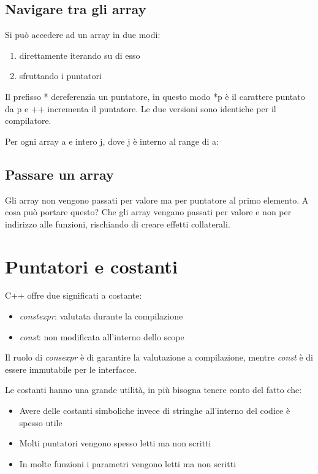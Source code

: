 \documentclass[11pt,a4paper]{book}
\begin{document}
\subsection{Navigare tra gli array}
Si può accedere ad un array in due modi:
\begin{enumerate}
	\item direttamente iterando su di esso
	\item sfruttando i puntatori
\end{enumerate}
\label{code: 090}
Il prefisso * dereferenzia un puntatore, in questo modo *p è il carattere puntato da p e ++ incrementa il puntatore. Le due versioni sono identiche per il compilatore.

Per ogni array a e intero j, dove j è interno al range di a:
\label{code: 091}

\subsection{Passare un array}
Gli array non vengono passati per valore ma per puntatore al primo elemento.
\label{code: 092}
A cosa può portare questo? Che gli array vengano passati per valore e non per indirizzo alle funzioni, rischiando di creare effetti collaterali.

\section{Puntatori e costanti}
C++ offre due significati a costante:
\begin{itemize}
	\item \emph{constexpr}: valutata durante la compilazione
	\item \emph{const}: non modificata all'interno dello scope
\end{itemize}

Il ruolo di \emph{consexpr} è di garantire la valutazione a compilazione, mentre \emph{const} è di essere immutabile per le interfacce.

Le costanti hanno una grande utilità, in più bisogna tenere conto del fatto che:
\begin{itemize}
	\item Avere delle costanti simboliche invece di stringhe all'interno del codice è spesso utile
	\item Molti puntatori vengono spesso letti ma non scritti
	\item In molte funzioni i parametri vengono letti ma non scritti
\end{itemize}
\end{document}
